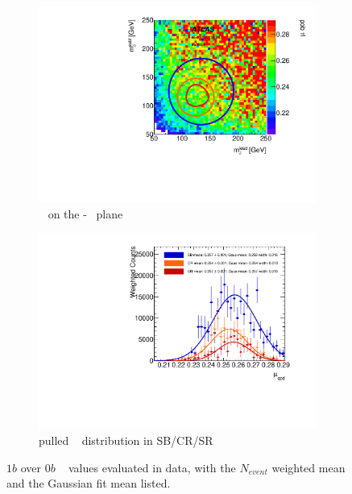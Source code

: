 \begin{figure}[htb!]
\centering
\captionsetup{justification=centering}
	\hspace{-1cm}
    \begin{subfigure}[b]{0.4\textwidth}
        \includegraphics[width=\textwidth,angle=-90]{figures/boosted/AppendixMuqcdstudy/OneTag_Incl_mH0H1.pdf}
        \caption{\muqcd~ on the \mleadJ-\msublJ~ plane}
        \label{fig:app-muqcd-1b-2d}
    \end{subfigure}
    \quad \quad \quad \quad 
    \begin{subfigure}[b]{0.4\textwidth}
        \includegraphics[width=\textwidth,angle=-90]{figures/boosted/AppendixMuqcdstudy/OneTag_Incl_mH0H1_pull.pdf}
        \caption{pulled \muqcd~ distribution in SB/CR/SR}
        \label{fig:app-muqcd-1b-pull}
    \end{subfigure}
\caption{$1b$ over $0b$ \muqcd~ values evaluated in data, with the $N_{event}$ weighted mean and the Gaussian fit mean listed.}
\label{fig:app-muqcd-1b}
\end{figure}


